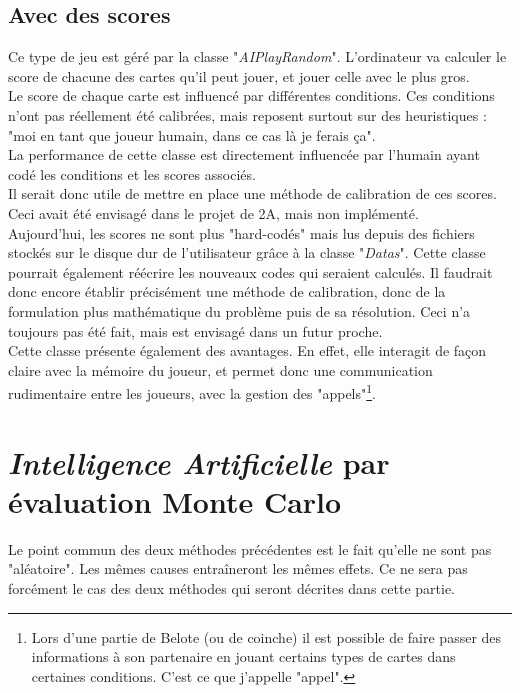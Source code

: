\documentclass[a4paper,11pt]{article}
\begin{document}
\subsection{Avec des scores}
Ce type de jeu est géré par la classe "\textit{AIPlayRandom}". L'ordinateur va calculer le score de chacune des cartes qu'il peut jouer, et jouer celle avec le plus gros. \\

Le score de chaque carte est influencé par différentes conditions. Ces conditions n'ont pas réellement été calibrées, mais reposent surtout sur des heuristiques : "moi en tant que joueur humain, dans ce cas là je ferais ça". \\

La performance de cette classe est directement influencée par l'humain ayant codé les conditions et les scores associés.\\
Il serait donc utile de mettre en place une méthode de calibration de ces scores. Ceci avait été envisagé dans le projet de 2A, mais non implémenté.\\
Aujourd'hui, les scores ne sont plus "hard-codés" mais lus depuis des fichiers stockés sur le disque dur de l'utilisateur grâce à la classe "\textit{Datas}". Cette classe pourrait également réécrire les nouveaux codes qui seraient calculés. Il faudrait donc encore établir précisément une méthode de calibration, donc de la formulation plus mathématique du problème puis de sa résolution. Ceci n'a toujours pas été fait, mais est envisagé dans un futur proche. \\

Cette classe présente également des avantages. En effet, elle interagit de façon claire avec la mémoire du joueur, et permet donc une communication rudimentaire entre les joueurs, avec la gestion des "appels"\footnote{Lors d'une partie de Belote (ou de coinche) il est possible de faire passer des informations à son partenaire en jouant certains types de cartes dans certaines conditions. C'est ce que j'appelle "appel".}.

\clearpage
\section{\textit{Intelligence Artificielle} par évaluation Monte Carlo \label{sec:MCPlay}}
Le point commun des deux méthodes précédentes est le fait qu'elle ne sont pas "aléatoire". Les mêmes causes entraîneront les mêmes effets. Ce ne sera pas forcément le cas des deux méthodes qui seront décrites dans cette partie. \\
\end{document}
